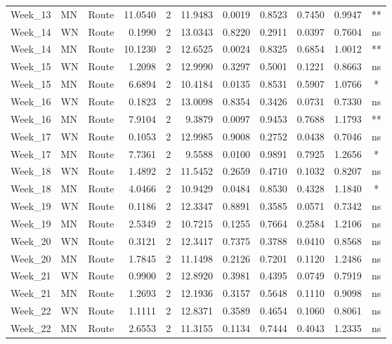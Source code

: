 \documentclass[
  12pt,
  letterpaper,
]{article}
\begin{document}
\begin{longtable}{lllrrrlrrrc}
Week\_13 & MN & Route & 11.0540 & 2 & 11.9483 & 0.0019 & 0.8523 & 0.7450 & 0.9947 & ** \\ 
Week\_14 & WN & Route & 0.1990 & 2 & 13.0343 & 0.8220 & 0.2911 & 0.0397 & 0.7604 & ns \\ 
Week\_14 & MN & Route & 10.1230 & 2 & 12.6525 & 0.0024 & 0.8325 & 0.6854 & 1.0012 & ** \\ 
Week\_15 & WN & Route & 1.2098 & 2 & 12.9990 & 0.3297 & 0.5001 & 0.1221 & 0.8663 & ns \\ 
Week\_15 & MN & Route & 6.6894 & 2 & 10.4184 & 0.0135 & 0.8531 & 0.5907 & 1.0766 & * \\ 
Week\_16 & WN & Route & 0.1823 & 2 & 13.0098 & 0.8354 & 0.3426 & 0.0731 & 0.7330 & ns \\ 
Week\_16 & MN & Route & 7.9104 & 2 & 9.3879 & 0.0097 & 0.9453 & 0.7688 & 1.1793 & ** \\ 
Week\_17 & WN & Route & 0.1053 & 2 & 12.9985 & 0.9008 & 0.2752 & 0.0438 & 0.7046 & ns \\ 
Week\_17 & MN & Route & 7.7361 & 2 & 9.5588 & 0.0100 & 0.9891 & 0.7925 & 1.2656 & * \\ 
Week\_18 & WN & Route & 1.4892 & 2 & 11.5452 & 0.2659 & 0.4710 & 0.1032 & 0.8207 & ns \\ 
Week\_18 & MN & Route & 4.0466 & 2 & 10.9429 & 0.0484 & 0.8530 & 0.4328 & 1.1840 & * \\ 
Week\_19 & WN & Route & 0.1186 & 2 & 12.3347 & 0.8891 & 0.3585 & 0.0571 & 0.7342 & ns \\ 
Week\_19 & MN & Route & 2.5349 & 2 & 10.7215 & 0.1255 & 0.7664 & 0.2584 & 1.2106 & ns \\ 
Week\_20 & WN & Route & 0.3121 & 2 & 12.3417 & 0.7375 & 0.3788 & 0.0410 & 0.8568 & ns \\ 
Week\_20 & MN & Route & 1.7845 & 2 & 11.1498 & 0.2126 & 0.7201 & 0.1120 & 1.2486 & ns \\ 
Week\_21 & WN & Route & 0.9900 & 2 & 12.8920 & 0.3981 & 0.4395 & 0.0749 & 0.7919 & ns \\ 
Week\_21 & MN & Route & 1.2693 & 2 & 12.1936 & 0.3157 & 0.5648 & 0.1110 & 0.9098 & ns \\ 
Week\_22 & WN & Route & 1.1111 & 2 & 12.8371 & 0.3589 & 0.4654 & 0.1060 & 0.8061 & ns \\ 
Week\_22 & MN & Route & 2.6553 & 2 & 11.3155 & 0.1134 & 0.7444 & 0.4043 & 1.2335 & ns \\ 
\bottomrule
\end{longtable}
\end{document}
